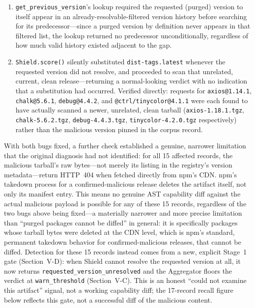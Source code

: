 \documentclass[journal]{IEEEtran}
\begin{document}
\begin{enumerate}
\item \texttt{get\_previous\_version}'s lookup required the requested (purged) version to itself appear in
an already-resolvable-filtered version history before searching for its predecessor---since a purged version
by definition never appears in that filtered list, the lookup returned no predecessor unconditionally,
regardless of how much valid history existed adjacent to the gap.
\item \texttt{Shield.score()} silently substituted \texttt{dist-tags.latest} whenever the requested version
did not resolve, and proceeded to scan that unrelated, current, clean release---returning a normal-looking
verdict with no indication that a substitution had occurred. Verified directly: requests for
\texttt{axios@1.14.1}, \texttt{chalk@5.6.1}, \texttt{debug@4.4.2}, and \texttt{@ctrl/tinycolor@4.1.1} were
each found to have actually scanned a newer, unrelated, clean tarball (\texttt{axios-1.18.1.tgz},
\texttt{chalk-5.6.2.tgz}, \texttt{debug-4.4.3.tgz}, \texttt{tinycolor-4.2.0.tgz} respectively) rather than the
malicious version pinned in the corpus record.
\end{enumerate}

With both bugs fixed, a further check established a genuine, narrower limitation that the original
diagnosis had not identified: for all 15 affected records, the malicious tarball's raw bytes---not merely
its listing in the registry's version metadata---return HTTP~404 when fetched directly from npm's CDN. npm's
takedown process for a confirmed-malicious release deletes the artifact itself, not only its manifest entry.
This means no genuine AST capability diff against the actual malicious payload is possible for any of these
15 records, regardless of the two bugs above being fixed---a materially narrower and more precise limitation
than ``purged packages cannot be diffed'' in general: it is specifically packages whose tarball bytes were
deleted at the CDN level, which is npm's standard, permanent takedown behavior for confirmed-malicious
releases, that cannot be diffed. Detection for these 15 records instead comes from a new, explicit Stage~1
gate (Section~V-D): when Shield cannot resolve the requested version at all, it now returns
\texttt{requested\_version\_unresolved} and the Aggregator floors the verdict at \texttt{warn\_threshold}
(Section~V-C). This is an honest ``could not examine this artifact'' signal, not a working capability diff;
the 17-record recall figure below reflects this gate, not a successful diff of the malicious content.
\end{document}
